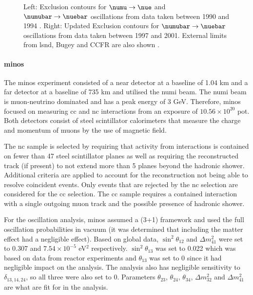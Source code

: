 \begin{figure}[h!]
    \caption[Exclusion contour from \gls{karmen} for \nue and \nuebar appearance.]{Left: Exclusion contours for $\numu \rightarrow \nue$  and  $\numubar \rightarrow \nuebar$ oscillations from data taken between 1990 and 1994 \cite{Limits_on_neutrino_oscillations_in_the_appearance_channels_numu_to_nue_and_numubar_to_nuebar}. Right: Updated Exclusion contours for $\numubar \rightarrow \nuebar$ oscillations from data taken between 1997 and 2001. External limits from \gls{lsnd}, Bugey and CCFR are also shown \cite{Upper_limits_for_neutrino_oscillations_numubar_to_nuebar_from_muon_decay_at_rest}.}
    \label{fig:karmen_contours}
\end{figure}

\paragraph{\gls{minos}}

The \gls{minos} experiment consisted of a near detector at a baseline of 1.04 km and a far detector at a baseline of 735 km and utilised the \gls{numi} beam. The \gls{numi} beam is muon-neutrino dominated and has a peak energy of 3 GeV. Therefore, \gls{minos} focused on measuring \numu \gls{cc} and \gls{nc} interactions from an exposure of $10.56 \times 10^20$ \gls{pot}. Both detectors consist of steel scintillator calorimeters that measure the charge and momentum of muons by the use of magnetic field. 

The \gls{nc} sample is selected by requiring that activity from interactions is contained on fewer than 47 steel scintillator planes as well as requiring the reconstructed track (if present) to not extend more than 5 planes beyond the hadronic shower. Additional criteria are applied to account for the reconstruction not being able to resolve coincident events. Only events that are rejected by the \gls{nc} selection are considered for the \gls{cc} selection. The \gls{cc} sample requires a contained interaction with a single outgoing muon track and the possible presence of hadronic shower. 

For the oscillation analysis, \gls{minos} assumed a (3+1) framework and used the full oscillation probabilities in vacuum (it was determined that including the matter effect had a negligible effect). Based on global data, $\sin^2{\theta_{12}}$ and $\Delta m^2_{41}$ were set to 0.307 and $7.54\times10^{-5}$ eV$^2$ respectively. $\sin^2{\theta_{13}}$ was set to 0.022 which was based on data from reactor experiments and $\theta_{13}$ was set to 0 since it had negligible impact on the analysis. The analysis also has negligible sensitivity to $\delta_{13,14,24}$, so all three were also set to 0. Parameters $\theta_{23}$, $\theta_{24}$, $\theta_{34}$, $\Delta m^2_{32}$ and $\Delta m^2_{41}$ are what are fit for in the analysis. 

